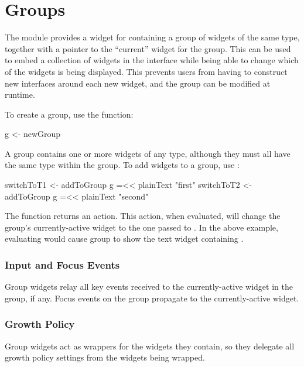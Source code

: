 \section{Groups}
\label{sec:groups}

The  module provides a widget for containing a group of
widgets of the same type, together with a pointer to the ``current''
widget for the group.  This can be used to embed a collection of
widgets in the interface while being able to change which of the
widgets is being displayed.  This prevents users from having to
construct new interfaces around each new widget, and the group can be
modified at runtime.

To create a group, use the  function:

\begin{haskellcode}
 g <- newGroup
\end{haskellcode}

A group contains one or more widgets of any type, although they must
all have the same type within the group.  To add widgets to a group,
use :

\begin{haskellcode}
 switchToT1 <- addToGroup g =<< plainText "first"
 switchToT2 <- addToGroup g =<< plainText "second"
\end{haskellcode}

The  function returns an  action.  This action,
when evaluated, will change the group's currently-active widget to the
one passed to .  In the above example, evaluating
 would cause group  to show the text widget
containing .

\subsubsection{Input and Focus Events}

Group widgets relay all key events received to the currently-active
widget in the group, if any.  Focus events on the group propagate to
the currently-active widget.

\subsubsection{Growth Policy}

Group widgets act as wrappers for the widgets they contain, so they
delegate all growth policy settings from the widgets being wrapped.
